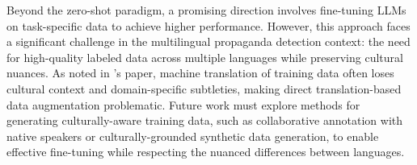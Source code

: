 Beyond the zero-shot paradigm, a promising direction involves fine-tuning LLMs on task-specific data to achieve higher performance. However, this approach faces a significant challenge in the multilingual propaganda detection context: the need for high-quality labeled data across multiple languages while preserving cultural nuances. As noted in \citep{eljadiri-nurbakova-2025-team}'s paper, machine translation of training data often loses cultural context and domain-specific subtleties, making direct translation-based data augmentation problematic. Future work must explore methods for generating culturally-aware training data, such as collaborative annotation with native speakers or culturally-grounded synthetic data generation, to enable effective fine-tuning while respecting the nuanced differences between languages.